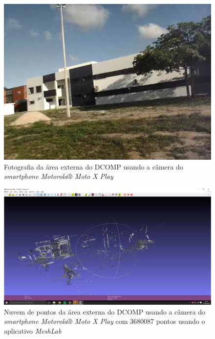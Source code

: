 \begin{figure}[H]
	\centering
		\includegraphics[width= \textwidth]{Imagens/figura4-9.jpg}
	\caption{Fotografia da área externa do DCOMP usando a câmera do \textit{smartphone Motorola® Moto X Play}}
\end{figure}

\begin{figure}[H]
	\centering
		\includegraphics[width= \textwidth]{Imagens/dcompMotox.PNG}
	\caption{Nuvem de pontos da área externa do DCOMP usando a câmera do \textit{smartphone Motorola® Moto X Play} com 3680087 pontos usando o aplicativo \textit{MeshLab}}
\end{figure}

